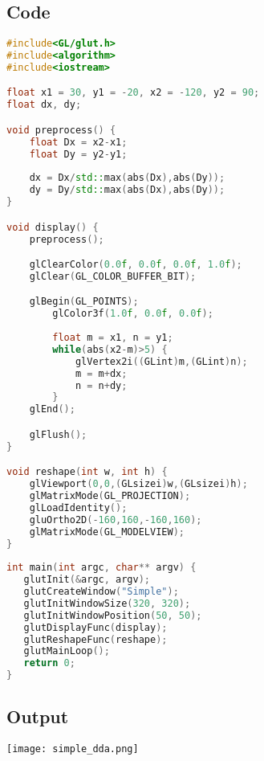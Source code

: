 \documentclass[a4paper, 11pt]{article}
\begin{document}
\subsection*{Code}
\begin{lstlisting}[language=C++]
#include<GL/glut.h>
#include<algorithm>
#include<iostream>

float x1 = 30, y1 = -20, x2 = -120, y2 = 90;
float dx, dy;

void preprocess() {
    float Dx = x2-x1;
    float Dy = y2-y1;
    
    dx = Dx/std::max(abs(Dx),abs(Dy));
    dy = Dy/std::max(abs(Dx),abs(Dy));
}

void display() {
    preprocess();

    glClearColor(0.0f, 0.0f, 0.0f, 1.0f);
    glClear(GL_COLOR_BUFFER_BIT);

    glBegin(GL_POINTS);
        glColor3f(1.0f, 0.0f, 0.0f);
        
        float m = x1, n = y1;
        while(abs(x2-m)>5) {
            glVertex2i((GLint)m,(GLint)n);
            m = m+dx;
            n = n+dy;
        }        
    glEnd();

    glFlush();
}

void reshape(int w, int h) {
    glViewport(0,0,(GLsizei)w,(GLsizei)h);
    glMatrixMode(GL_PROJECTION);
    glLoadIdentity();
    gluOrtho2D(-160,160,-160,160);
    glMatrixMode(GL_MODELVIEW);
}
 
int main(int argc, char** argv) {
   glutInit(&argc, argv);
   glutCreateWindow("Simple");
   glutInitWindowSize(320, 320);
   glutInitWindowPosition(50, 50);
   glutDisplayFunc(display);
   glutReshapeFunc(reshape);
   glutMainLoop();
   return 0;
}
\end{lstlisting}

\subsection*{Output}
\begin{center}
\texttt{[image: simple\_dda.png]}
\end{center}
\end{document}
